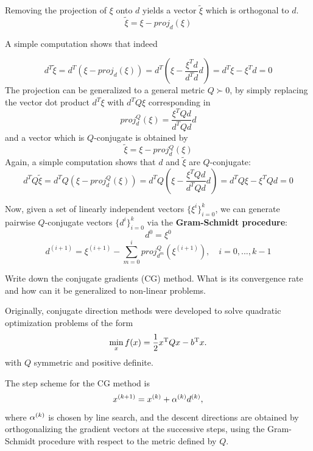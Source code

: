 \documentclass[12pt,a4paper]{article}
\begin{document}
		Removing the projection of $\xi$ onto $d$ yields a vector $\tilde{\xi}$ which is orthogonal to $d$.
		$$\tilde{\xi} = \xi - proj_d(\xi)$$
		
		A simple computation shows that indeed 
		
		$$d^T \tilde{\xi} = d^{T} (\xi - proj_d(\xi)) = d^{T}(\xi - \frac{\xi^T d}{d^Td}d) = d^{T} \xi - \xi^{T}d = 0$$
		The projection can be generalized to a general metric $Q \succ 0$, by simply replacing the vector dot product $d^{T}\xi$ with $d^{T}Q\xi$ corresponding in 
		$$ proj_d^Q(\xi) = \frac{\xi^T Q d}{d^TQd}d$$
		and a vector which is $Q$-conjugate is obtained by
		$$\tilde{\xi} = \xi - proj_d^Q(\xi)$$
		Again, a simple computation shows that $d$ and $\tilde{\xi}$ are $Q$-conjugate:
		$$d^T Q \tilde{\xi} = d^{T}Q (\xi - proj_d^Q(\xi)) = d^{T}Q(\xi - \frac{\xi^T Qd}{d^TQd}d) = d^{T} Q \xi - \xi^{T} Q d = 0$$
		
		Now, given a set of linearly independent vectors $\{\xi^i\}^k_{i=0}$, we can generate pairwise $Q$-conjugate vectors $\{d^i\}^k_{i=0}$ via the\textbf{ Gram-Schmidt procedure}:
		$$ d^0 = \xi^0$$
		$$ d^{(i+1)} = \xi^{(i+1)} - \sum_{m = 0}^{i} proj_{d^m}^{Q}(\xi^{(i+1)}), \quad i = 0,...,k-1$$

\begin{question}
 Write down the conjugate gradients (CG) method. What is its convergence rate and how can it be generalized to non-linear problems.

\end{question}

Originally, conjugate direction methods were developed to solve quadratic optimization problems of the form
\begin{equation*}
    \min_x f(x) = \frac{1}{2} \T{x} Q x - \T{b} x.
\end{equation*}
with $Q$ symmetric and positive definite.

The step scheme for the CG method is
\begin{equation*}
  \kth[k+1]{x} = \kth{x} + \kth{\alpha}\kth{d},
\end{equation*}
where $\kth{\alpha}$ is chosen by line search, and the descent directions are obtained by
orthogonalizing the gradient vectors at the successive steps, using the Gram-Schmidt procedure with
respect to the metric defined by \(Q\).
\end{document}
